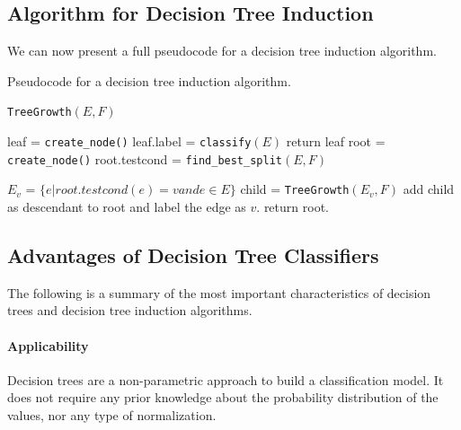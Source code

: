 
\subsection{Algorithm for Decision Tree Induction}

We can now present a full pseudocode for a decision tree induction algorithm.

\begin{algorithm}
\caption{Pseudocode for a decision tree induction algorithm.}
\texttt{TreeGrowth}$(E,F)$
\begin{algorithmic}[1]
            \State leaf = \texttt{create\_node()}
            \State leaf.label = \texttt{classify}$(E)$
            \State return leaf
        \Else
            \State root = \texttt{create\_node()}
            \State root.testcond = \texttt{find\_best\_split}$(E,F)$

                \State $E_v$ = $\{e | root.testcond(e) = v and e \in E \}$
                \State child = \texttt{TreeGrowth}$(E_v,F)$
                \State add child as descendant to root and label the edge as $v$.
            \EndFor
        \EndIf
        \State return root.
\end{algorithmic}
\end{algorithm}

\subsection{Advantages of Decision Tree Classifiers}

The following is a summary of the most important characteristics of decision trees and decision tree induction algorithms.

\paragraph{Applicability}
Decision trees are a non-parametric approach to build a classification model. It does not require any prior knowledge about the probability distribution of the values, nor any type of normalization.

